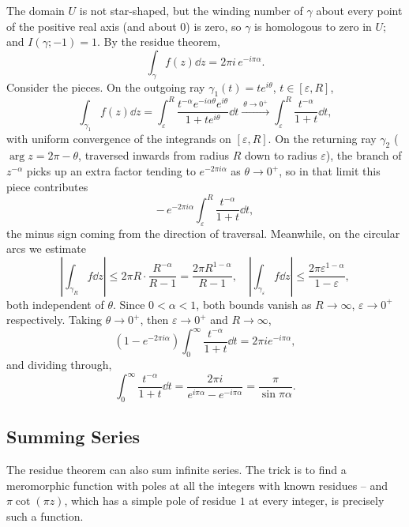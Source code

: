 \documentclass[a4paper]{scrartcl}
\begin{document}
\begin{example}
    The domain $U$ is not star-shaped, but the winding number of $\gamma$ about every point of the positive real axis (and about $0$) is zero, so $\gamma$ is homologous to zero in $U$; and $I(\gamma; -1) = 1$. By the residue theorem,
    $$
    \int_\gamma f(z) \dd z = 2 \pi i \, e^{-i \pi \alpha}.
    $$
    Consider the pieces. On the outgoing ray $\gamma_1(t) = te^{i\theta}$, $t \in [\varepsilon, R]$,
    $$
    \int_{\gamma_1} f(z) \dd z = \int_\varepsilon^R \frac{t^{-\alpha}e^{-i \alpha \theta}e^{i \theta}}{1 + te^{i\theta}} \dd t \xrightarrow{\ \theta \to 0^+\ } \int_\varepsilon^R \frac{t^{-\alpha}}{1 + t} \dd t,
    $$
    with uniform convergence of the integrands on $[\varepsilon, R]$. On the returning ray $\gamma_2$ ($\arg z = 2\pi - \theta$, traversed inwards from radius $R$ down to radius $\varepsilon$), the branch of $z^{-\alpha}$ picks up an extra factor tending to $e^{-2 \pi i \alpha}$ as $\theta \rightarrow 0^+$, so in that limit this piece contributes
    $$
    -\, e^{-2 \pi i \alpha}\int_\varepsilon^R \frac{t^{-\alpha}}{1 + t} \dd t,
    $$
    the minus sign coming from the direction of traversal. Meanwhile, on the circular arcs we estimate
    $$
    \left|\int_{\gamma_R} f \dd z\right| \leq 2 \pi R \cdot \frac{R^{-\alpha}}{R - 1} = \frac{2 \pi R^{1 - \alpha}}{R - 1},
    \quad
    \left|\int_{\gamma_\varepsilon} f \dd z\right| \leq \frac{2 \pi \varepsilon^{1 - \alpha}}{1 - \varepsilon},
    $$
    both independent of $\theta$. Since $0 < \alpha < 1$, both bounds vanish as $R \rightarrow \infty$, $\varepsilon \rightarrow 0^+$ respectively. Taking $\theta \rightarrow 0^+$, then $\varepsilon \rightarrow 0^+$ and $R \rightarrow \infty$,
    $$
    \left(1 - e^{-2 \pi i \alpha}\right)\int_0^{\infty} \frac{t^{-\alpha}}{1 + t} \dd t = 2 \pi i e^{-i \pi \alpha},
    $$
    and dividing through,
    $$
    \int_0^{\infty} \frac{t^{-\alpha}}{1 + t} \dd t = \frac{2 \pi i}{e^{i \pi \alpha} - e^{-i \pi \alpha}} = \frac{\pi}{\sin \pi \alpha}.
    $$
\end{example}

\subsection{Summing Series}

The residue theorem can also sum infinite series. The trick is to find a meromorphic function with poles at all the integers with known residues -- and $\pi\cot(\pi z)$, which has a simple pole of residue $1$ at every integer, is precisely such a function.
\end{document}
